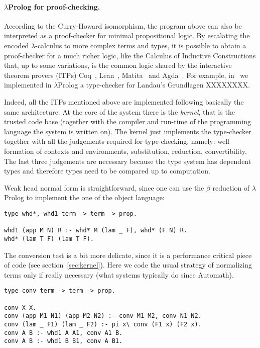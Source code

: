 \documentclass{easychair}
\begin{document}
\paragraph{$\lambda$Prolog for proof-checking.}

According to the Curry-Howard isomorphism, the program above can also
be interpreted as a proof-checker for minimal propositional logic. By
escalating the encoded $\lambda$-calculus to more complex terms and
types, it is possible to obtain a proof-checker for a much richer
logic, like the Calculus of Inductive Constructions that, up to some
variations, is the common logic shared by the interactive theorem
provers (ITPs) Coq~\cite{}, Lean~\cite{}, Matita~\cite{} and
Agda~\cite{}. For example, in~\cite{us} we implemented in
$\lambda$Prolog a type-checker for Landau's Grundlagen XXXXXXXX.

Indeed, all the ITPs mentioned above are implemented following
basically the same architecture. At the core of the system there is
the \emph{kernel}, that is the trusted code base (together with the
compiler and run-time of the programming language the system is
written on). The kernel just implements the type-checker together with
all the judgements required for type-checking, namely: well formation
of contexts and environments, substitution, reduction, convertibility.
The last three judgements are necessary because the type system has
dependent types and therefore types need to be compared up to
computation.

Weak head normal form is straightforward, since one can use the
$\beta$ reduction of $\lambda$Prolog to implement the one of the
object language:

\begin{verbatim}
type whd*, whd1 term -> term -> prop.

whd1 (app M N) R :- whd* M (lam _ F), whd* (F N) R.
whd* (lam T F) (lam T F).
\end{verbatim}

The conversion test is a bit more delicate, since it is a performance
critical piece of code (see section~\ref{sec:kernel}).  Here we code
the usual strategy of normalizing terms only if really necessary (what
systems typically do since Automath).

\begin{verbatim}
type conv term -> term -> prop.

conv X X.
conv (app M1 N1) (app M2 N2) :- conv M1 M2, conv N1 N2.
conv (lam _ F1) (lam _ F2) :- pi x\ conv (F1 x) (F2 x).
conv A B :- whd1 A A1, conv A1 B.
conv A B :- whd1 B B1, conv A B1.
\end{verbatim}
\end{document}
